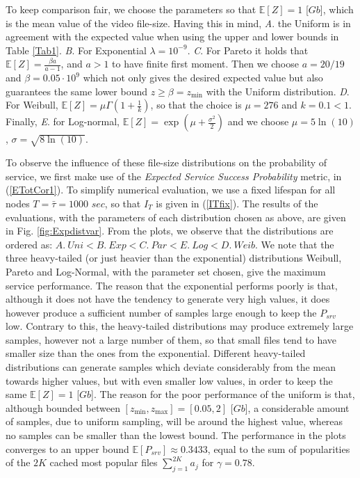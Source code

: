 \documentclass[conference]{IEEEtran}
\begin{document}
To keep comparison fair, we choose the parameters so that $\mathbb{E}\left[Z\right] = 1$ [$Gb$], which is the mean value of the video file-size. Having this in mind, \textit{A}. the Uniform is in agreement with the expected value when using the upper and lower bounds in Table \ref{Tab1}. \textit{B}. For Exponential $\lambda = 10^{-9}$. \textit{C}. For Pareto it holds that $\mathbb{E}[Z] = \frac{\beta a}{a-1}$, and $a>1$ to have finite first moment. Then we choose $a=20/19$ and $\beta=0.05\cdot 10^{9}$ which not only gives the desired expected value but also guarantees the same lower bound $z\geq \beta=z_{\min}$  with the Uniform distribution. \textit{D}. For Weibull, $\mathbb{E}\left[Z\right]=\mu\Gamma(1+\frac{1}{k})$, so that the choice is $\mu=276$ and $k=0.1<1$. Finally, \textit{E}. for Log-normal, $\mathbb{E}\left[Z\right]=\exp(\mu+\frac{\sigma^2}{2})$ and we choose $\mu=5\ln(10)$, $\sigma=\sqrt{8\ln(10)}$.

To observe the influence of these file-size distributions on the probability of service, we first make use of the \textit{Expected Service Success Probability} metric, in (\ref{ETotCor1}). To simplify numerical evaluation, we use a fixed lifespan for all nodes $T=\bar{\tau}=1000$ $sec$, so that $I_T$ is given in (\ref{ITfix}). The results of the evaluations, with the parameters of each distribution chosen as above, are given in Fig. \ref{fig:Expdistvar}. From the plots, we observe that the distributions are ordered as: $A.\ Uni <B.\ Exp <C.\ Par <E.\ Log <D.\ Weib$. We note that the three heavy-tailed (or just heavier than the exponential) distributions Weibull, Pareto and Log-Normal, with the parameter set chosen, give the maximum service performance. The reason that the exponential performs poorly is that, although it does not have the tendency to generate very high values, it does however produce a sufficient number of samples large enough to keep the $P_{srv}$ low. Contrary to this, the heavy-tailed distributions may produce extremely large samples, however not a large number of them, so that small files tend to have smaller size than the ones from the exponential. Different heavy-tailed distributions can generate samples which deviate considerably from the mean towards higher values, but with even smaller low values, in order to keep the same $\mathbb{E}[Z] = 1$ [$Gb$]. The reason for the poor performance of the uniform is that, although bounded between $[z_{\min}, z_{\max}]=[0.05, 2]$ [$Gb$], a considerable amount of samples, due to uniform sampling, will be around the highest value, whereas no samples can be smaller than the lowest bound. The performance in the plots converges to an upper bound $\mathbb{E} [P_{srv} ]\approx 0.3433$, equal to the sum of popularities of the $2K$ cached most popular files $\sum_{j=1}^{2K}a_j$ for $\gamma=0.78$.
\end{document}
